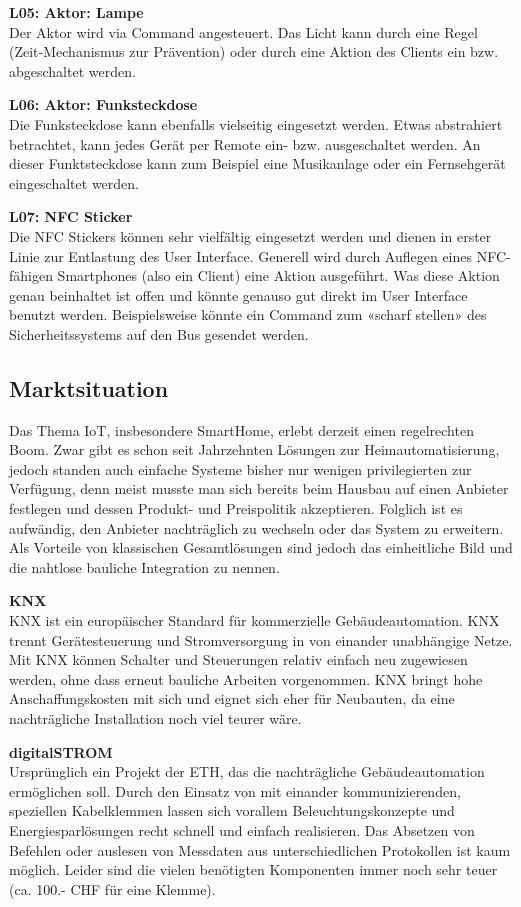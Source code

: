 \textbf{L05: Aktor: Lampe} \\
Der Aktor wird via Command angesteuert. Das Licht kann durch eine Regel (Zeit-Mechanismus zur Prävention) oder durch eine Aktion des Clients ein bzw. abgeschaltet werden.

\textbf{L06: Aktor: Funksteckdose} \\
Die Funksteckdose kann ebenfalls vielseitig eingesetzt werden. Etwas abstrahiert betrachtet, kann jedes Gerät per Remote ein- bzw. ausgeschaltet werden. An dieser Funktsteckdose kann zum Beispiel eine Musikanlage oder ein Fernsehgerät eingeschaltet werden.

\textbf{L07: NFC Sticker} \\
Die NFC Stickers können sehr vielfältig eingesetzt werden und dienen in erster Linie zur Entlastung des User Interface. Generell wird durch Auflegen eines NFC-fähigen Smartphones (also ein Client) eine Aktion ausgeführt. Was diese Aktion genau beinhaltet ist offen und könnte genauso gut direkt im User Interface benutzt werden. Beispielsweise könnte ein Command zum «scharf stellen» des Sicherheitssystems auf den Bus gesendet werden.

\subsection{Marktsituation}
Das Thema IoT, insbesondere SmartHome, erlebt derzeit einen regelrechten Boom. Zwar gibt es schon seit Jahrzehnten Lösungen zur Heimautomatisierung, jedoch standen auch einfache Systeme bisher nur wenigen privilegierten zur Verfügung, denn meist musste man sich bereits beim Hausbau auf einen Anbieter  festlegen und dessen Produkt- und Preispolitik akzeptieren. Folglich ist es aufwändig, den Anbieter nachträglich zu wechseln oder das System zu erweitern. Als Vorteile von klassischen Gesamtlösungen sind jedoch das einheitliche Bild und die nahtlose bauliche Integration zu nennen.

\textbf{KNX} \\
KNX ist ein europäischer Standard für kommerzielle Gebäudeautomation. KNX trennt Gerätesteuerung und Stromversorgung in von einander unabhängige Netze. Mit KNX können Schalter und Steuerungen relativ einfach neu zugewiesen werden, ohne dass erneut bauliche Arbeiten vorgenommen. KNX bringt hohe Anschaffungskosten mit sich und eignet sich eher für Neubauten, da eine nachträgliche Installation noch viel teurer wäre.

\textbf{digitalSTROM} \\
Ursprünglich ein Projekt der ETH, das die nachträgliche Gebäudeautomation ermöglichen soll. Durch den Einsatz von mit einander kommunizierenden, speziellen Kabelklemmen lassen sich vorallem Beleuchtungskonzepte und Energiesparlösungen recht schnell und einfach realisieren. Das Absetzen von Befehlen oder auslesen von Messdaten aus unterschiedlichen Protokollen ist kaum möglich. Leider sind die vielen benötigten Komponenten immer noch sehr teuer (ca. 100.- CHF für eine Klemme). 

